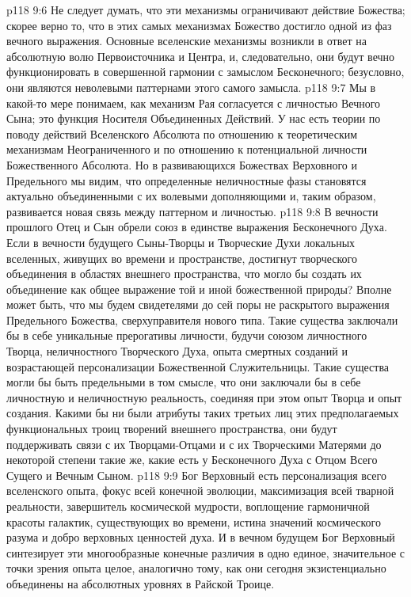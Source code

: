 \vs p118 9:6 Не следует думать, что эти механизмы ограничивают действие Божества; скорее верно то, что в этих самых механизмах Божество достигло одной из фаз вечного выражения. Основные вселенские механизмы возникли в ответ на абсолютную волю Первоисточника и Центра, и, следовательно, они будут вечно функционировать в совершенной гармонии с замыслом Бесконечного; безусловно, они являются неволевыми паттернами этого самого замысла.
\vs p118 9:7 Мы в какой\hyp{}то мере понимаем, как механизм Рая согласуется с личностью Вечного Сына; это функция Носителя Объединенных Действий. У нас есть теории по поводу действий Вселенского Абсолюта по отношению к теоретическим механизмам Неограниченного и по отношению к потенциальной личности Божественного Абсолюта. Но в развивающихся Божествах Верховного и Предельного мы видим, что определенные неличностные фазы становятся актуально объединенными с их волевыми дополняющими и, таким образом, развивается новая связь между паттерном и личностью.
\vs p118 9:8 В вечности прошлого Отец и Сын обрели союз в единстве выражения Бесконечного Духа. Если в вечности будущего Сыны\hyp{}Творцы и Творческие Духи локальных вселенных, живущих во времени и пространстве, достигнут творческого объединения в областях внешнего пространства, что могло бы создать их объединение как общее выражение той и иной божественной природы? Вполне может быть, что мы будем свидетелями до сей поры не раскрытого выражения Предельного Божества, сверхуправителя нового типа. Такие существа заключали бы в себе уникальные прерогативы личности, будучи союзом личностного Творца, неличностного Творческого Духа, опыта смертных созданий и возрастающей персонализации Божественной Служительницы. Такие существа могли бы быть предельными в том смысле, что они заключали бы в себе личностную и неличностную реальность, соединяя при этом опыт Творца и опыт создания. Какими бы ни были атрибуты таких третьих лиц этих предполагаемых функциональных троиц творений внешнего пространства, они будут поддерживать связи с их Творцами\hyp{}Отцами и с их Творческими Матерями до некоторой степени такие же, какие есть у Бесконечного Духа с Отцом Всего Сущего и Вечным Сыном.
\vs p118 9:9 \pc Бог Верховный есть персонализация всего вселенского опыта, фокус всей конечной эволюции, максимизация всей тварной реальности, завершитель космической мудрости, воплощение гармоничной красоты галактик, существующих во времени, истина значений космического разума и добро верховных ценностей духа. И в вечном будущем Бог Верховный синтезирует эти многообразные конечные различия в одно единое, значительное с точки зрения опыта целое, аналогично тому, как они сегодня экзистенциально объединены на абсолютных уровнях в Райской Троице.
